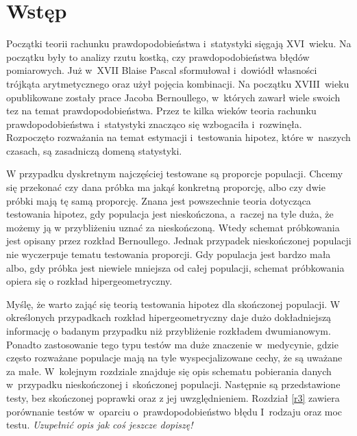 \chapter*{Wstęp}
Początki teorii rachunku prawdopodobieństwa i~statystyki sięgają XVI~wieku. Na początku były to analizy rzutu kostką, czy prawdopodobieństwa błędów pomiarowych. Już w~XVII Blaise Pascal sformułował i~dowiódł własności trójkąta arytmetycznego oraz użył pojęcia kombinacji. Na początku XVIII~wieku opublikowane zostały prace Jacoba Bernoullego, w~których zawarł wiele swoich tez na temat prawdopodobieństwa. Przez te kilka wieków teoria rachunku prawdopodobieństwa i~statystyki znacząco się wzbogaciła i~rozwinęła. Rozpoczęto rozważania na temat estymacji i~testowania hipotez, które w~naszych czasach, są zasadniczą domeną statystyki.

W przypadku dyskretnym najczęściej testowane są proporcje populacji. Chcemy się przekonać czy dana próbka ma jakąś konkretną proporcję, albo czy dwie próbki mają tę samą proporcję. Znana jest powszechnie teoria dotycząca testowania hipotez, gdy populacja jest nieskończona, a~raczej na tyle duża, że możemy ją w przybliżeniu uznać za nieskończoną. Wtedy schemat próbkowania jest opisany przez rozkład Bernoullego. Jednak przypadek nieskończonej populacji nie wyczerpuje tematu testowania proporcji. Gdy populacja jest bardzo mała albo, gdy próbka jest niewiele mniejsza od całej populacji, schemat próbkowania opiera się o rozkład hipergeometryczny. 

Myślę, że warto zająć się teorią testowania hipotez dla skończonej populacji. W określonych przypadkach rozkład hipergeometryczny daje dużo dokładniejszą informację o badanym przypadku niż przybliżenie rozkładem dwumianowym. Ponadto zastosowanie tego typu testów ma duże znaczenie w~medycynie, gdzie często rozważane populacje mają na tyle wyspecjalizowane cechy, że są uważane za małe. W~kolejnym rozdziale znajduje się opis schematu pobierania danych w~przypadku nieskończonej i~skończonej populacji. Następnie są przedstawione testy, bez skończonej poprawki oraz z jej uwzględnieniem. Rozdział \ref{r3} zawiera porównanie testów w~oparciu o~prawdopodobieństwo błędu I~rodzaju oraz moc testu. \textit{Uzupełnić opis jak coś jeszcze dopiszę!}